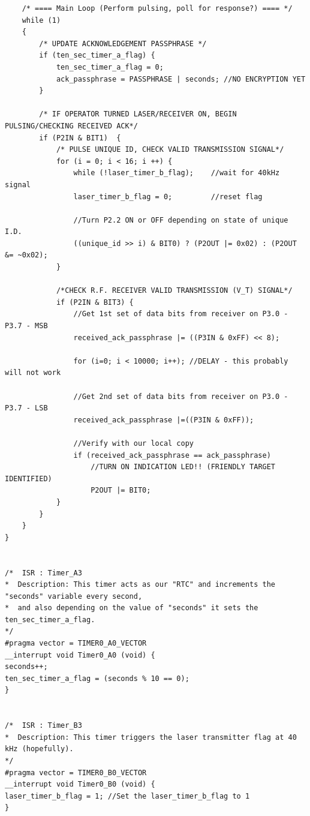 \documentclass[letterpaper,10pt]{article}
\begin{document}
\begin{spacing}{1.15}
\begin{lstlisting}
	/* ==== Main Loop (Perform pulsing, poll for response?) ==== */
	while (1)
	{
		/* UPDATE ACKNOWLEDGEMENT PASSPHRASE */
		if (ten_sec_timer_a_flag) {
			ten_sec_timer_a_flag = 0;
			ack_passphrase = PASSPHRASE | seconds; //NO ENCRYPTION YET
		}
		
		/* IF OPERATOR TURNED LASER/RECEIVER ON, BEGIN PULSING/CHECKING RECEIVED ACK*/
		if (P2IN & BIT1)  {
			/* PULSE UNIQUE ID, CHECK VALID TRANSMISSION SIGNAL*/
			for (i = 0; i < 16; i ++) {
				while (!laser_timer_b_flag);    //wait for 40kHz signal
				laser_timer_b_flag = 0;         //reset flag
				
				//Turn P2.2 ON or OFF depending on state of unique I.D.
				((unique_id >> i) & BIT0) ? (P2OUT |= 0x02) : (P2OUT &= ~0x02);
			}
			
			/*CHECK R.F. RECEIVER VALID TRANSMISSION (V_T) SIGNAL*/
			if (P2IN & BIT3) {
				//Get 1st set of data bits from receiver on P3.0 - P3.7 - MSB
				received_ack_passphrase |= ((P3IN & 0xFF) << 8);
				
				for (i=0; i < 10000; i++); //DELAY - this probably will not work
				
				//Get 2nd set of data bits from receiver on P3.0 - P3.7 - LSB
				received_ack_passphrase |=((P3IN & 0xFF));
				
				//Verify with our local copy
				if (received_ack_passphrase == ack_passphrase)
					//TURN ON INDICATION LED!! (FRIENDLY TARGET IDENTIFIED)
					P2OUT |= BIT0;
			} 
		}
	} 
}


/*  ISR : Timer_A3
*  Description: This timer acts as our "RTC" and increments the "seconds" variable every second,
*  and also depending on the value of "seconds" it sets the ten_sec_timer_a_flag.
*/
#pragma vector = TIMER0_A0_VECTOR
__interrupt void Timer0_A0 (void) {
seconds++;
ten_sec_timer_a_flag = (seconds % 10 == 0);
}


/*  ISR : Timer_B3
*  Description: This timer triggers the laser transmitter flag at 40 kHz (hopefully).
*/
#pragma vector = TIMER0_B0_VECTOR
__interrupt void Timer0_B0 (void) {
laser_timer_b_flag = 1; //Set the laser_timer_b_flag to 1
}


\end{lstlisting}



\end{spacing}
\end{document}

